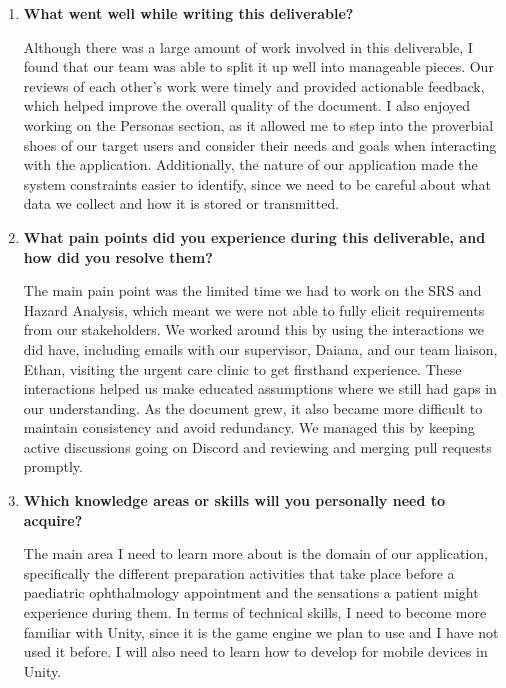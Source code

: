 \documentclass[10pt]{article}
\begin{document}
\begin{enumerate}

    \item \textbf{What went well while writing this deliverable?}

    Although there was a large amount of work involved in this deliverable,
    I found that our team was able to split it up well into manageable
    pieces. Our reviews of each other's work were timely and provided
    actionable feedback, which helped improve the overall quality of the
    document. I also enjoyed working on the Personas section, as it
    allowed me to step into the proverbial shoes of our target users and
    consider their needs and goals when interacting with the application.
    Additionally, the nature of our application made the system constraints
    easier to identify, since we need to be careful about what data we
    collect and how it is stored or transmitted.

    \item \textbf{What pain points did you experience during this
    deliverable, and how did you resolve them?}

    The main pain point was the limited time we had to work on the SRS
    and Hazard Analysis, which meant we were not able to fully elicit
    requirements from our stakeholders. We worked around this by using
    the interactions we did have, including emails with our supervisor,
    Daiana, and our team liaison, Ethan, visiting the urgent care clinic
    to get firsthand experience. These interactions helped us make
    educated assumptions where we still had gaps in our understanding.
    As the document grew, it also became more difficult to maintain
    consistency and avoid redundancy. We managed this by keeping active
    discussions going on Discord and reviewing and merging pull requests
    promptly.

    \setcounter{enumi}{4}

    \item \textbf{Which knowledge areas or skills will you personally
    need to acquire?}

    The main area I need to learn more about is the domain of our
    application, specifically the different preparation activities that
    take place before a paediatric ophthalmology appointment and the
    sensations a patient might experience during them. In terms of
    technical skills, I need to become more familiar with Unity, since
    it is the game engine we plan to use and I have not used it before.
    I will also need to learn how to develop for mobile devices in Unity.


\end{enumerate}
\end{document}

